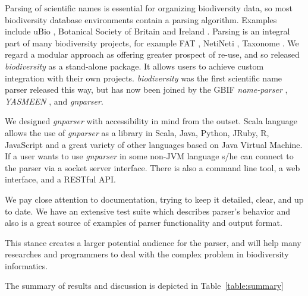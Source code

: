 \documentclass{bmcart}
\begin{document}
Parsing of scientific names is essential for organizing biodiversity data, so
most biodiversity database environments contain a parsing algorithm.  Examples
include  uBio \cite{ubio:parser}, Botanical Society of Britain and Ireland
\cite{botsociety:parser}.  Parsing is an integral part of many biodiversity
projects, for example FAT \cite{Sautter2006}, NetiNeti \cite{Akella2012},
Taxonome \cite{Kluyver2013}. We regard a modular approach as offering greater
prospect of re-use, and so  released \textit{biodiversity} \cite{Boyle2013} as
a stand-alone package.  It allows users to achieve custom integration  with
their own projects.  \textit{biodiversity} was the first scientific name parser
released this way, but has now been joined by the GBIF \textit{name-parser}
\cite{gbifNameParser}, \textit{YASMEEN} \cite{VandenBerghe2015}, and
\textit{gnparser}.

We designed \textit{gnparser} with accessibility in mind from the outset. Scala
language allows the use of \textit{gnparser} as a library in Scala, Java,
Python, JRuby, R, JavaScript and a great variety of other languages based on
Java Virtual Machine. If a user wants to use \textit{gnparser}  in some non-JVM
language s/he can connect to the parser via a socket server interface. There is
also a command line tool, a web interface, and a RESTful API.

We pay close attention to documentation, trying to keep it detailed, clear, and
up to date. We have an extensive test suite which describes parser's behavior
and also is a great source of examples of parser  functionality and output
format.

This stance creates a larger potential audience for the parser, and will help
many researches and programmers to deal with the complex problem in
biodiversity informatics.

The summary of results and discussion is depicted in
Table~\ref{table:summary}
\end{document}
